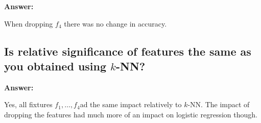 \documentclass[12pt, a4paper]{extarticle}
\newcommand{\answer}[1]{\textbf{Answer: }\par#1}
\newcommand{\knn}{\texorpdfstring{$k$-NN}}
\newcommand{\var}[1]{\texorpdfstring{#1}\xspace}
\newcommand{\fixture}[1]{\texorpdfstring{\ensuremath{f_{#1}}}\xspace}
\begin{document}
    \answer{When dropping \fixture{4}, there was no change in accuracy.}

    \subsection{Is relative significance of features the same as you obtained using \knn{}?} \label{subsec:question6.5}

    \answer{Yes, all fixtures \var{$f_1,\dots,f_4$} had the same impact relatively to \knn{}. The impact of dropping the features had much more of an impact on logistic regression though.}

    \newpage
    \onehalfspacing

    
\end{document}
